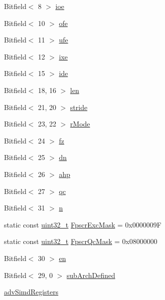 \begin{DoxyCompactItemize}
\item 
Bitfield$<$ 8 $>$ \hyperlink{namespaceArmISA_a3e1ea0243cc4f61d562ed5d5183b11d4}{ioe}
\item 
Bitfield$<$ 10 $>$ \hyperlink{namespaceArmISA_a3b67f8dc58e4264bfcd141a558c356ad}{ofe}
\item 
Bitfield$<$ 11 $>$ \hyperlink{namespaceArmISA_afbacb2a3f2c6c583c2929848706e6ed0}{ufe}
\item 
Bitfield$<$ 12 $>$ \hyperlink{namespaceArmISA_a97c101c49ad715276e85cca497a5951f}{ixe}
\item 
Bitfield$<$ 15 $>$ \hyperlink{namespaceArmISA_a12c551fa840211ff81e39f3dc8bc5b71}{ide}
\item 
Bitfield$<$ 18, 16 $>$ \hyperlink{namespaceArmISA_a41a9f22a6c7645fac2f8d633371e354d}{len}
\item 
Bitfield$<$ 21, 20 $>$ \hyperlink{namespaceArmISA_a37eb53a9544702853d40d1e014ba88ea}{stride}
\item 
Bitfield$<$ 23, 22 $>$ \hyperlink{namespaceArmISA_a6a8214ac21eb2991c2975c0380f64b82}{rMode}
\item 
Bitfield$<$ 24 $>$ \hyperlink{namespaceArmISA_ab78e6f5e06fa0e1a891ba8922503fe19}{fz}
\item 
Bitfield$<$ 25 $>$ \hyperlink{namespaceArmISA_a3ffc7ab40b0627645193ddf7b81bc13d}{dn}
\item 
Bitfield$<$ 26 $>$ \hyperlink{namespaceArmISA_acf99d519ed9ff881041d37d0b45b9c61}{ahp}
\item 
Bitfield$<$ 27 $>$ \hyperlink{namespaceArmISA_aece17ca538b27782542baaa0e7a64d0a}{qc}
\item 
Bitfield$<$ 31 $>$ \hyperlink{namespaceArmISA_aeab71244afb687f16d8c4f5ee9d6ef0e}{n}
\item 
static const \hyperlink{Type_8hh_a435d1572bf3f880d55459d9805097f62}{uint32\_\-t} \hyperlink{namespaceArmISA_a695b59e93dc8675d9ba81a41eb63a2f5}{FpscrExcMask} = 0x0000009F
\item 
static const \hyperlink{Type_8hh_a435d1572bf3f880d55459d9805097f62}{uint32\_\-t} \hyperlink{namespaceArmISA_a63ef34dc7855010c37dfce5bd68767ef}{FpscrQcMask} = 0x08000000
\item 
Bitfield$<$ 30 $>$ \hyperlink{namespaceArmISA_aa3e54588246d2e7102283e3c9fb2e480}{en}
\item 
Bitfield$<$ 29, 0 $>$ \hyperlink{namespaceArmISA_a4031e52e2b57dc10a30a6706cf7ef242}{subArchDefined}
\item 
\hyperlink{namespaceArmISA_a6d6cd77e4b8cfd69e2ff733ca8a1323c}{advSimdRegisters}
\item 

\end{DoxyCompactItemize}
